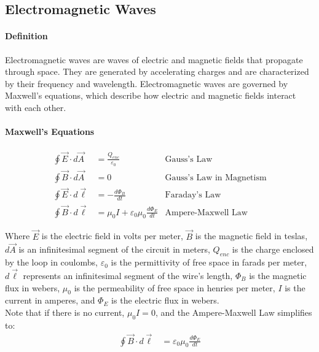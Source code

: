 \subsection{Electromagnetic Waves}
\hrulefill

\paragraph*{Definition}
Electromagnetic waves are waves of electric and magnetic fields that propagate through space. They are generated by accelerating charges 
and are characterized by their frequency and wavelength. Electromagnetic waves are governed by Maxwell's equations, which describe how electric
and magnetic fields interact with each other.

\paragraph*{Maxwell's Equations}

\begin{align*}
    \oint \vec{E} \cdot d\vec{A} &= \frac{Q_{enc}}{\varepsilon_0} &\text{Gauss's Law}\\
    \oint \vec{B} \cdot d\vec{A} &= 0 &\text{Gauss's Law in Magnetism}\\
    \oint \vec{E} \cdot d\vec{\ell} &= -\frac{d\Phi_B}{dt} &\text{Faraday's Law}\\
    \oint \vec{B} \cdot d\vec{\ell} &= \mu_0 I + \varepsilon_0\mu_0\frac{d\Phi_E}{dt} &\text{Ampere-Maxwell Law}
\end{align*}

Where $\vec{E}$ is the electric field in volts per meter, $\vec{B}$ is the magnetic field in teslas, $d\vec{A}$ is an infinitesimal 
segment of the circuit in meters, $Q_{enc}$ is the charge enclosed by the loop in coulombs, $\varepsilon_0$ is the permittivity of free 
space in farads per meter, $d\vec{\ell}$ represents an infinitesimal segment of the wire's length, $\Phi_B$ is the magnetic flux in webers, 
$\mu_0$ is the permeability of free space in henries per meter, $I$ is the current in amperes, and $\Phi_E$ is the electric flux in webers.\\

Note that if there is no current, $\mu_0 I = 0$, and the Ampere-Maxwell Law simplifies to:
\begin{align*}
    \oint \vec{B} \cdot d\vec{\ell} &= \varepsilon_0\mu_0\frac{d\Phi_E}{dt}
\end{align*}

